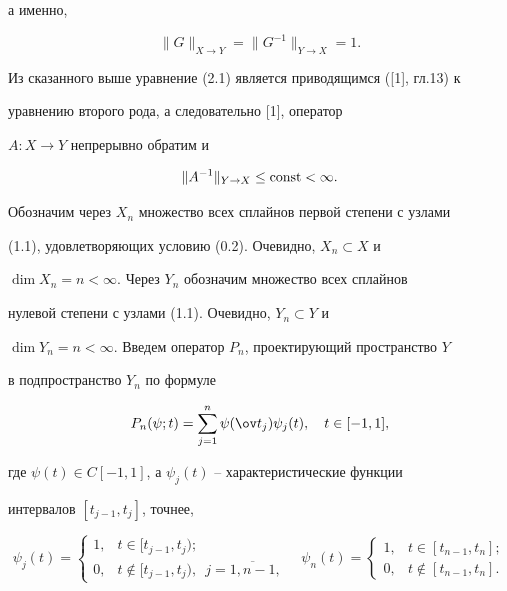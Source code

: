 а именно,


\begin{equation}


\| G\|_{X\to Y}=\| G^{-1}\|_{Y\to X}=1.


\end{equation}


Из сказанного выше уравнение (2.1) является приводящимся ([1], гл.13) к


уравнению второго рода, а следовательно [1], оператор 


$A:X\to Y$ непрерывно обратим и


\begin{equation}


\| A^{-1}\|_{Y\to X}\leq \const<\infty.


\end{equation}





Обозначим через $X_n$ множество всех сплайнов первой степени с узлами


(1.1), удовлетворяющих условию (0.2). Очевидно, $X_n\subset X$ и


$\dim X_n=n<\infty$. Через $Y_n$ обозначим множество всех сплайнов 


нулевой степени с узлами (1.1). Очевидно, $Y_n\subset Y$ и 


$\dim Y_n=n<\infty$. Введем оператор $P_n$, проектирующий пространство $Y$


в подпространство $Y_n$ по формуле


\begin{equation}


P_n(\psi;t)=\sum_{j=1}^n\psi(\ov t_j)\psi_j(t), \quad t\in[-1, 1], 


\end{equation}


где $\psi(t)\in C[-1, 1]$, а $\psi_j(t)$ -- характеристические функции


интервалов $[t_{j-1}, t_j]$, точнее, 


\begin{equation}


\psi_j(t)=


\begin{cases}


1, & t\in[t_{j-1}, t_j); \\


0, & t\notin[t_{j-1}, t_j), \ \;j=\overline{1, n-1},


\end{cases}


\quad


\psi_n(t)=


\begin{cases}


1, & t\in[t_{n-1}, t_n];\\


0, & t\notin[t_{n-1}, t_n].


\end{cases}


\end{equation}





